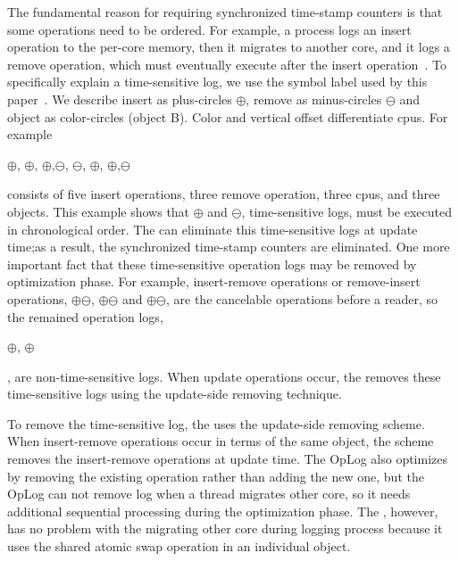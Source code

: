 The fundamental reason for requiring synchronized time-stamp counters is that some
operations need to be ordered.
For example, a process logs an insert operation to the per-core memory, then
it migrates to another core, and it logs a remove operation, which must eventually
execute after the insert operation~\cite{SilasBoydWickizerPth}.
To specifically explain a time-sensitive log, we use the symbol label used by
this paper~\cite{Clements15SCR}.
We describe insert as plus-circles $\oplus$, remove as minus-circles
$\ominus$ and object as color-circles (object B). 
Color and vertical offset differentiate cpus.
For example
\begin{center}
$\oplus$, $\oplus$, $\oplus$,$\ominus$,
$\ominus$, $\oplus$, $\oplus$,$\ominus$
\end{center}
consists of five insert operations, three remove operation, three cpus, and
three objects.
This example shows that $\oplus$ and $\ominus$,
time-sensitive logs, must be executed in chronological order.
The \LDU can eliminate this time-sensitive logs at update time;as a result, the synchronized time-stamp counters are eliminated.
One more important fact that these time-sensitive operation logs may be removed
by optimization phase.
For example, insert-remove operations or remove-insert operations, 
$\oplus$$\ominus$, $\oplus$$\ominus$ 
and $\oplus$$\ominus$, are the cancelable operations before
a reader, so the remained operation logs, 
\begin{center}
 $\oplus$, $\oplus$
\end{center}
, are non-time-sensitive logs.
When update operations occur, the \LDU removes these time-sensitive logs using
the update-side removing technique.


To remove the time-sensitive log, the \LDU uses the update-side removing scheme.
When insert-remove operations occur in terms of the same object, the scheme removes the insert-remove operations at update time.
The OpLog also optimizes by removing the existing operation rather than
adding the new one, but the OpLog can not remove log when a thread 
migrates other core, so it needs additional sequential processing during
the optimization phase.
The \LDU, however, has no problem with the migrating other core during logging
process because it uses the shared atomic swap operation in an individual object.

